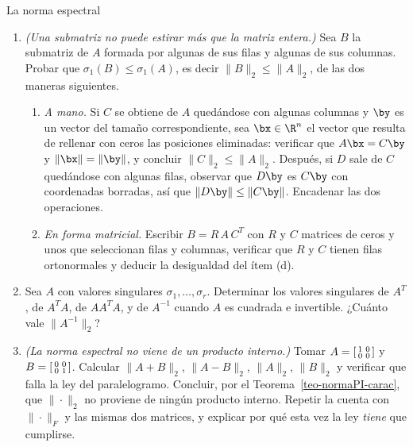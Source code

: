 \begin{entrega}{La norma espectral}
\begin{enumerate}[label=\textbf{(\alph*)},itemsep=3pt,topsep=4pt]
\item \emph{(Una submatriz no puede estirar más que la matriz entera.)} Sea
$B$ la submatriz de $A$ formada por algunas de sus filas y algunas de sus
columnas. Probar que $\sigma_1(B)\le\sigma_1(A)$, es decir
$\|B\|_2\le\|A\|_2$, de las dos maneras siguientes.
\begin{enumerate}[label=(\roman*)]
\item \emph{A mano.} Si $C$ se obtiene de $A$ quedándose con algunas
columnas y $\by$ es un vector del tamaño correspondiente, sea $\bx\in\R^n$ el
vector que resulta de rellenar con ceros las posiciones eliminadas: verificar
que $A\bx=C\by$ y $\|\bx\|=\|\by\|$, y concluir $\|C\|_2\le\|A\|_2$. Después,
si $D$ sale de $C$ quedándose con algunas filas, observar que $D\by$ es
$C\by$ con coordenadas borradas, así que $\|D\by\|\le\|C\by\|$. Encadenar las
dos operaciones.
\item \emph{En forma matricial.} Escribir $B=R\,A\,C^T$ con $R$ y $C$
matrices de ceros y unos que seleccionan filas y columnas, verificar que $R$ y
$C$ tienen filas ortonormales y deducir la desigualdad del ítem (d).
\end{enumerate}

\item Sea $A$ con valores singulares $\sigma_1,\dots,\sigma_r$. Determinar
los valores singulares de $A^T$, de $A^TA$, de $AA^TA$, y de $A^{-1}$ cuando
$A$ es cuadrada e invertible. ¿Cuánto vale $\|A^{-1}\|_2$?

\item \emph{(La norma espectral no viene de un producto interno.)} Tomar
$A=\begin{bsmallmatrix}1&0\\ 0&0\end{bsmallmatrix}$ y
$B=\begin{bsmallmatrix}0&0\\ 0&1\end{bsmallmatrix}$. Calcular
$\|A+B\|_2$, $\|A-B\|_2$, $\|A\|_2$, $\|B\|_2$ y verificar que falla la ley
del paralelogramo. Concluir, por el Teorema~\ref{teo-normaPI-carac}, que
$\|\cdot\|_2$ no proviene de ningún producto interno. Repetir la cuenta con
$\|\cdot\|_F$ y las mismas dos matrices, y explicar por qué esta vez la ley
\emph{tiene} que cumplirse.
\end{enumerate}

\medskip
{}
\end{entrega}

